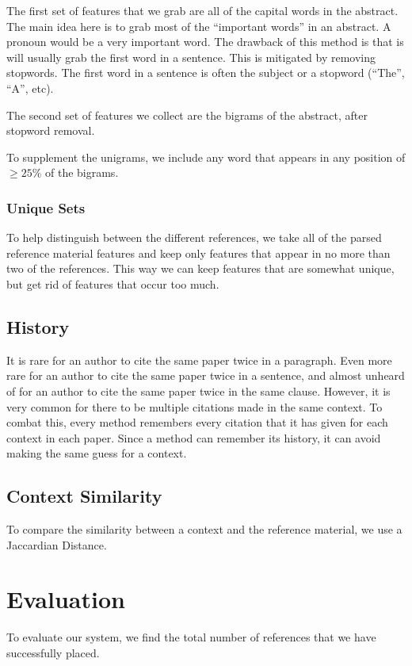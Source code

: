 \documentclass[10pt, conference, compsocconf]{IEEEtran}
\begin{document}
The first set of features that we grab are all of the capital words in the abstract. The main idea here is to grab
most of the ``important words'' in an abstract. A pronoun would be a very important word. The drawback of this method is that
is will usually grab the first word in a sentence. This is mitigated by removing stopwords. The first word in a sentence
is often the subject or a stopword (``The'', ``A'', etc).

The second set of features we collect are the bigrams of the abstract, after stopword removal.

To supplement the unigrams, we include any word that appears in any position of $\geq25\%$ of the bigrams.

\subsubsection{Unique Sets}
To help distinguish between the different references, we take all of the parsed reference material features and
keep only features that appear in no more than two of the references. This way we can keep features that are somewhat
unique, but get rid of features that occur too much.

\subsection{History}
It is rare for an author to cite the same paper twice in a paragraph. Even more rare for
an author to cite the same paper twice in a sentence, and almost unheard of for an author to cite the
same paper twice in the same clause. However, it is very common for there to be multiple citations
made in the same context. To combat this, every method remembers every citation that it has given
for each context in each paper. Since a method can remember its history, it can avoid making the
same guess for a context.

\subsection{Context Similarity}
To compare the similarity between a context and the reference material, we use a Jaccardian Distance\cite{jaccard}.

\section{Evaluation}
To evaluate our system, we find the total number of references that we have successfully placed.
\end{document}
